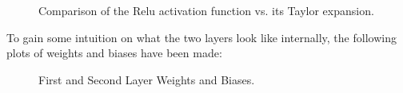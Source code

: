 \begin{figure}[H]
  \centering
  \caption{Comparison of the Relu activation function vs. its Taylor expansion.}
  \label{fig:taylor-relu}
\end{figure}

To gain some intuition on what the two layers look like internally, the following plots of weights and biases have been made:
\begin{figure}[H]
  \centering
  \caption{First and Second Layer Weights and Biases.}
  \label{fig:layer-1-and-2}
\end{figure}

